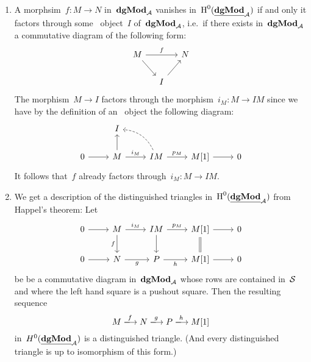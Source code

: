 \documentclass[a4paper,10pt]{scrartcl}
\begin{document}
\begin{enumerate}
  \item
    A morphsim~$f \colon M \to N$ in~$\mathbf{dgMod}_{\mathcal{A}}$ vanishes in~$\operatorname{H}^0(\underline{\mathbf{dgMod}}_{\mathcal{A}})$ if and only it factors through some~{\injective{$\Sfrob$}} object~$I$ of~$\mathbf{dgMod}_{\mathcal{A}}$, i.e.\ if there exists in~$\mathbf{dgMod}_{\mathcal{A}}$ a commutative diagram of the following form:
    \[
      \begin{tikzcd}[column sep = small]
        M
        \arrow{rr}[above]{f}
        \arrow{dr}
        &
        {}
        &
        N
        \\
        {}
        &
        I
        \arrow{ur}
        &
        {}
      \end{tikzcd}
    \]
    The morphism~$M \to I$ factors through the morphism~$i_M \colon M \to IM$ since we have by the definition of an~{\injective{$\Sfrob$}} object the following diagram:
    \[
      \begin{tikzcd}
        {}
        &
        I
        &
        {}
        &
        {}
        &
        {}
        \\
        0
        \arrow{r}
        &
        M
        \arrow{u}
        \arrow{r}[above]{i_M}
        &
        IM
        \arrow[dashed, bend right]{ul}
        \arrow{r}[above]{p_M}
        &
        M[1]
        \arrow{r}
        &
        0
      \end{tikzcd}
    \]
    It follows that~$f$ already factors through~$i_M \colon M \to IM$.
  \item
    We get a description of the distinguished triangles in~$\operatorname{H}^0(\underline{\mathbf{dgMod}}_{\mathcal{A}})$ from Happel’s theorem:
    Let
    \[
      \begin{tikzcd}
        0
        \arrow{r}
        &
        M
        \arrow{r}[above]{i_M}
        \arrow{d}[left]{f}
        &
        IM
        \arrow{r}[above]{p_M}
        \arrow{d}
        &
        M[1]
        \arrow{r}
        \arrow[equal]{d}
        &
        0
        \\
        0
        \arrow{r}
        &
        N
        \arrow{r}[below]{g}
        &
        P
        \arrow{r}[below]{h}
        &
        M[1]
        \arrow{r}
        &
        0
      \end{tikzcd}
    \]
    be be a commutative diagram in~$\mathbf{dgMod}_{\mathcal{A}}$ whose rows are contained in~$\Sfrob$ and where the left hand square is a pushout square.
    Then the resulting sequence
    \[
      M
      \xlongto{f}
      N
      \xlongto{g}
      P
      \xlongto{h}
      M[1]
    \]
    in~$H^0(\underline{\mathbf{dgMod}}_{\mathcal{A}})$ is a distinguished triangle.
    (And every distinguished triangle is up to isomorphism of this form.)
\end{enumerate}
\end{document}
